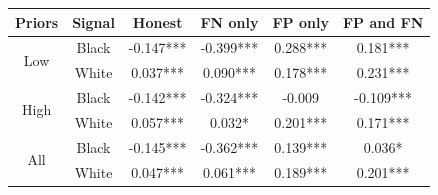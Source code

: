 \begin{tabular}{cccccc} \hline \hline
\textbf{Priors}&\textbf{Signal}&\textbf{Honest}&\textbf{FN only}&\textbf{FP only}&\textbf{FP and FN}\\ \hline
\multirow{2}{*}{Low}&Black&-0.147***&-0.399***&0.288***&0.181***\\
&White&0.037***&0.090***&0.178***&0.231***\\
\multirow{2}{*}{High}&Black&-0.142***&-0.324***&-0.009&-0.109***\\
&White&0.057***&0.032*&0.201***&0.171***\\
\multirow{2}{*}{All}&Black&-0.145***&-0.362***&0.139***&0.036*\\
&White&0.047***&0.061***&0.189***&0.201***\\
\hline \end{tabular}
